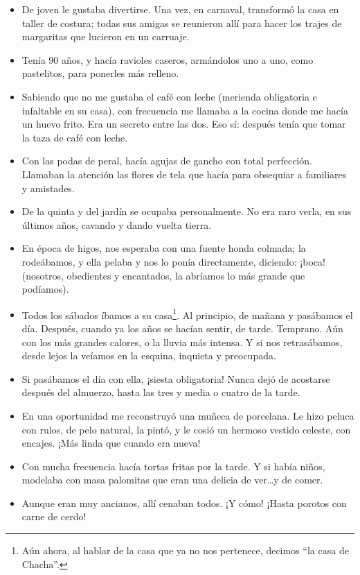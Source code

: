 \documentclass[a4paper]{article}
\begin{document}
\begin{itemize}
    \item{De joven le gustaba divertirse. Una vez, en carnaval, transformó la casa en taller de costura; todas sus amigas se reunieron allí para hacer los trajes de margaritas que lucieron en un carruaje.}
    \item{Tenía 90 años, y hacía ravioles caseros, armándolos uno a uno, como pastelitos, para ponerles más relleno.}
    \item{Sabiendo que no me gustaba el café con leche (merienda obligatoria e infaltable en su casa), con frecuencia me llamaba a la cocina donde me hacía un huevo frito. Era un secreto entre las dos. Eso sí: después tenía que tomar la taza de café con leche.}
    \item{Con las podas de peral, hacía agujas de gancho con total perfección. Llamaban la atención las flores de tela que hacía para obsequiar a familiares y amistades.}
    \item{De la quinta y del jardín se ocupaba personalmente. No era raro verla, en sus últimos años, cavando y dando vuelta tierra.}
    \item{En época de higos, nos esperaba con una fuente honda colmada; la rodeábamos, y ella pelaba y nos lo ponía directamente, diciendo: ¡boca! (nosotros, obedientes y encantados, la abríamos lo más grande que podíamos).}
    \item{Todos los sábados íbamos a su casa\footnote{Aún ahora, al hablar de la casa que ya no nos pertenece, decimos ``la casa de Chacha''.}. Al principio, de mañana y pasábamos el día. Después, cuando ya los años se hacían sentir, de tarde. Temprano. Aún con los más grandes calores, o la lluvia más intensa. Y si nos retrasábamos, desde lejos la veíamos en la esquina, inquieta y preocupada.}
    \item{Si pasábamos el día con ella, ¡siesta obligatoria! Nunca dejó de acostarse después del almuerzo, hasta las tres y media o cuatro de la tarde.}
    \item{En una oportunidad me reconstruyó una muñeca de porcelana. Le hizo peluca con rulos, de pelo natural, la pintó, y le cosió un hermoso vestido celeste, con encajes. ¡Más linda que cuando era nueva!}
    \item{Con mucha frecuencia hacía tortas fritas por la tarde. Y si había niños, modelaba con masa palomitas que eran una delicia de ver\ldots y de comer.}
    \item{Aunque eran muy ancianos, allí cenaban todos. ¡Y cómo! ¡Hasta porotos con carne de cerdo!}
\end{itemize}
\end{document}
